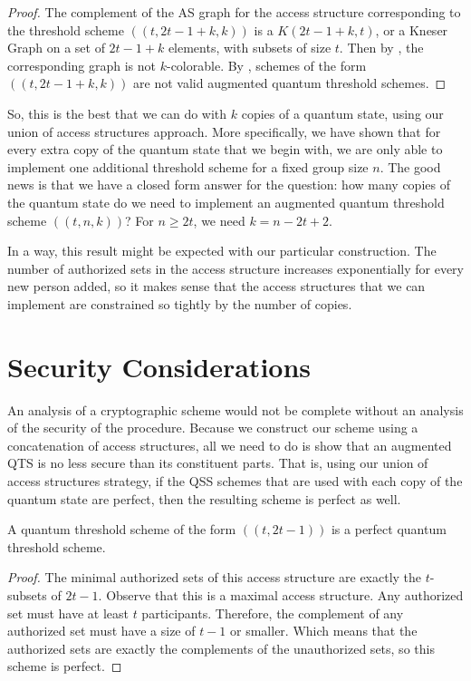 \begin{proof}
    The complement of the AS graph for the access structure corresponding to the threshold scheme $((t,2t-1+k,k))$ is a $K(2t-1+k,t)$, or a Kneser Graph on a set of $2t-1+k$ elements, with subsets of size $t$. Then by , the corresponding graph is not $k$-colorable. By , schemes of the form $((t,2t-1+k,k))$ are not valid augmented quantum threshold schemes.
\end{proof}

So, this is the best that we can do with $k$ copies of a quantum state, using our union of access structures approach. More specifically, we have shown that for every extra copy of the quantum state that we begin with, we are only able to implement one additional threshold scheme for a fixed group size $n$. The good news is that we have a closed form answer for the question: how many copies of the quantum state do we need to implement an augmented quantum threshold scheme $((t,n,k))$? For $n \geq 2t$, we need $k = n - 2t + 2$.

In a way, this result might be expected with our particular construction. The number of authorized sets in the access structure increases exponentially for every new person added, so it makes sense that the access structures that we can implement are constrained so tightly by the number of copies.

\section{Security Considerations}

An analysis of a cryptographic scheme would not be complete without an analysis of the security of the procedure. Because we construct our scheme using a concatenation of access structures, all we need to do is show that an augmented QTS is no less secure than its constituent parts. That is, using our union of access structures strategy, if the QSS schemes that are used with each copy of the quantum state are perfect, then the resulting scheme is perfect as well.

\begin{lemma}
    \label{lem:t-2t-1}
    A quantum threshold scheme of the form $((t,2t-1))$ is a perfect quantum threshold scheme.
\end{lemma}

\begin{proof}
    The minimal authorized sets of this access structure are exactly the $t$-subsets of $2t-1$. Observe that this is a maximal access structure. Any authorized set must have at least $t$ participants. Therefore, the complement of any authorized set must have a size of $t-1$ or smaller. Which means that the authorized sets are exactly the complements of the unauthorized sets, so this scheme is perfect.
\end{proof}

